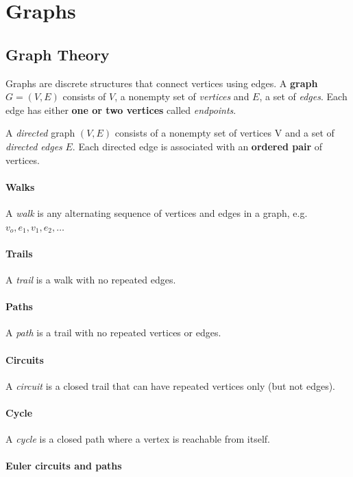 \section{Graphs}
\subsection{Graph Theory} 
Graphs are discrete structures that connect vertices using edges. A \textbf{graph} \( G = (V,E) \) consists of \( V \), a nonempty set of \emph{vertices} and \( E \), a set of \emph{edges}. Each edge has either \textbf{one or two vertices} called \emph{endpoints}.

A \emph{directed} graph \( (V,E) \) consists of a nonempty set of vertices V and a set of \emph{directed edges} \( E \). Each directed edge is associated with an \textbf{ordered pair} of vertices.

\paragraph{Walks} A \emph{walk} is any alternating sequence of vertices and edges in a graph, e.g. \( v_o, e_1, v_1, e_2, \ldots \) 

\paragraph{Trails} A \emph{trail} is a walk with no repeated edges.

\paragraph{Paths} A \emph{path} is a trail with no repeated vertices or edges.

\paragraph{Circuits} A \emph{circuit} is a closed trail that can have repeated vertices only (but not edges).

\paragraph{Cycle} A \emph{cycle} is a closed path where a vertex is reachable from itself.

\paragraph{Euler circuits and paths}

